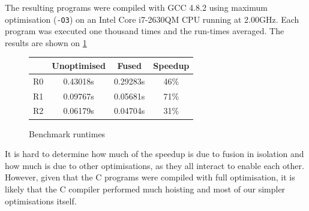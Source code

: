 The resulting programs were compiled with GCC 4.8.2 using maximum
optimisation (\texttt{-O3}) on an Intel Core i7-2630QM CPU running at
2.00GHz.  Each program was executed one thousand times and the
run-times averaged.  The results are shown on \cref{fig:speedups}

\begin{figure}
\begin{center}
\begin{tabular}{l|c|c|c}
   & \textbf{Unoptimised} & \textbf{Fused} & \textbf{Speedup} \\\hline
R0 & 0.43018s & 0.29283s & 46\% \\
R1 & 0.09767s & 0.05681s & 71\% \\
R2 & 0.06179s & 0.04704s & 31\%
\end{tabular}
\end{center}

\caption{Benchmark runtimes}

\label{fig:speedups}
\end{figure}

It is hard to determine how much of the speedup is due to fusion in
isolation and how much is due to other optimisations, as they all
interact to enable each other.  However, given that the C programs
were compiled with full optimisation, it is likely that the C compiler
performed much hoisting and most of our simpler optimisations itself.


